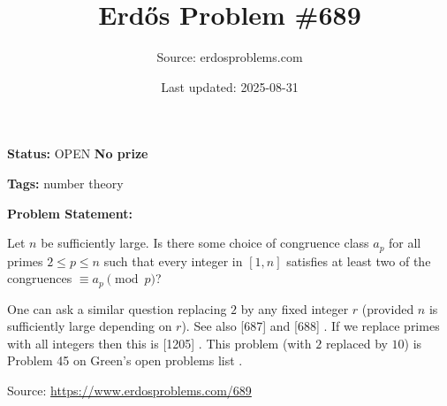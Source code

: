 \documentclass{article}
\title{Erd\H{o}s Problem \#689}
\date{Last updated: 2025-08-31}
\author{Source: erdosproblems.com}
\begin{document}
\maketitle

\noindent\textbf{Status:} OPEN \quad \textbf{No prize}

\noindent\textbf{Tags:} number theory

\medskip

\noindent\textbf{Problem Statement:}

Let $n$ be sufficiently large. Is there some choice of congruence class $a_p$ for all primes $2\leq p\leq n$ such that every integer in $[1,n]$ satisfies at least two of the congruences $\equiv a_p\pmod{p}$?




One can ask a similar question replacing $2$ by any fixed integer $r$ (provided $n$ is sufficiently large depending on $r$). See also [687] and [688] . If we replace primes with all integers then this is [1205] . This problem (with $2$ replaced by $10$) is Problem 45 on Green's open problems list .


\bigskip
\noindent\small{Source: \url{https://www.erdosproblems.com/689}}
\end{document}
